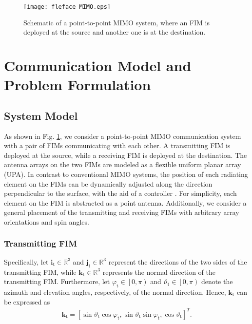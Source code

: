 \documentclass[lettersize,journal]{IEEEtran}
\begin{document}
\begin{figure}[!t]
\centering
\texttt{[image: fleface\_MIMO.eps]}
\caption{Schematic of a point-to-point MIMO system, where an FIM is deployed at the source and another one is at the destination.}\vspace{-0.5cm}
\label{fig_2}
\end{figure}

\section{Communication Model and Problem Formulation}\label{sec2}

\subsection{System Model}
As shown in Fig. \ref{fig_2}, we consider a point-to-point MIMO communication system with a pair of FIMs communicating with each other. A transmitting FIM is deployed at the source, while a receiving FIM is deployed at the destination. The antenna arrays on the two FIMs are modeled as a flexible uniform planar array (UPA). In contrast to conventional MIMO systems, the position of each radiating element on the FIMs can be dynamically adjusted along the direction perpendicular to the surface, with the aid of a controller \cite{Nature_2022_Bai_A}. For simplicity, each element on the FIM is abstracted as a point antenna. Additionally, we consider a general placement of the transmitting and receiving FIMs with arbitrary array orientations and spin angles.
\subsubsection{Transmitting FIM}
Specifically, let $\mathbf{i}_{\textrm{t}}\in \mathbb{R}^{3}$ and $\mathbf{j}_{\textrm{t}}\in \mathbb{R}^{3}$ represent the directions of the two sides of the transmitting FIM, while $\mathbf{k}_{\textrm{t}}\in \mathbb{R}^{3}$ represents the normal direction of the transmitting FIM. Furthermore, let $\varphi_{\textrm{t}}\in \left [ 0,\pi \right )$ and $\vartheta_{\textrm{t}}\in \left [ 0,\pi \right )$ denote the azimuth and elevation angles, respectively, of the normal direction. Hence, $\mathbf{k}_{\textrm{t}}$ can be expressed as
\begin{align}\label{eq1}
 \mathbf{k}_{\textrm{t}} = \left [ \sin\vartheta _{\textrm{t}}\cos\varphi _{\textrm{t}},\sin\vartheta_{\textrm{t}}\sin\varphi _{\textrm{t}},\cos\vartheta _{\textrm{t}} \right ] ^{T}.
\end{align}
\end{document}
